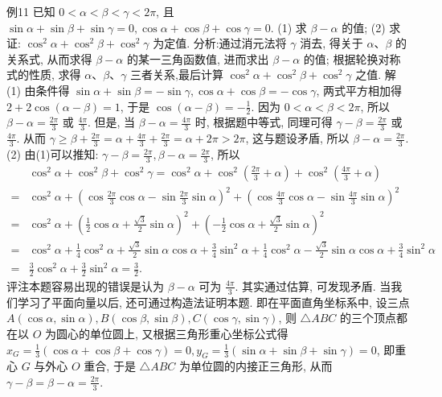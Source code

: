 例11 已知 $0<\alpha<\beta<\gamma<2 \pi$, 且 $\sin \alpha+\sin \beta+\sin \gamma=0, \cos \alpha+ \cos \beta+\cos \gamma=0$. (1) 求 $\beta-\alpha$ 的值; (2) 求证: $\cos ^2 \alpha+\cos ^2 \beta+\cos ^2 \gamma$ 为定值.
分析:通过消元法将 $\gamma$ 消去, 得关于 $\alpha 、 \beta$ 的关系式, 从而求得 $\beta-\alpha$ 的某一三角函数值, 进而求出 $\beta-\alpha$ 的值; 根据轮换对称式的性质, 求得 $\alpha 、 \beta 、 \gamma$ 三者关系,最后计算 $\cos ^2 \alpha+\cos ^2 \beta+\cos ^2 \gamma$ 之值.
解 (1) 由条件得 $\sin \alpha+\sin \beta=-\sin \gamma, \cos \alpha+\cos \beta=-\cos \gamma$, 两式平方相加得 $2+2 \cos (\alpha-\beta)=1$, 于是 $\cos (\alpha-\beta)=-\frac{1}{2}$. 因为 $0<\alpha<\beta<2 \pi$, 所以 $\beta-\alpha=\frac{2 \pi}{3}$ 或 $\frac{4 \pi}{3}$.
但是, 当 $\beta-\alpha=\frac{4 \pi}{3}$ 时, 根据题中等式, 同理可得 $\gamma-\beta=\frac{2 \pi}{3}$ 或 $\frac{4 \pi}{3}$. 从而 $\gamma \geqslant \beta+\frac{2 \pi}{3}=\alpha+\frac{4 \pi}{3}+\frac{2 \pi}{3}=\alpha+2 \pi>2 \pi$, 这与题设矛盾, 所以 $\beta-\alpha=\frac{2 \pi}{3}$.
(2) 由(1)可以推知: $\gamma-\beta=\frac{2 \pi}{3}, \beta-\alpha=\frac{2 \pi}{3}$, 所以
$$
\begin{aligned}
& \cos ^2 \alpha+\cos ^2 \beta+\cos ^2 \gamma=\cos ^2 \alpha+\cos ^2\left(\frac{2 \pi}{3}+\alpha\right)+\cos ^2\left(\frac{4 \pi}{3}+\alpha\right) \\
= & \cos ^2 \alpha+\left(\cos \frac{2 \pi}{3} \cos \alpha-\sin \frac{2 \pi}{3} \sin \alpha\right)^2+\left(\cos \frac{4 \pi}{3} \cos \alpha-\sin \frac{4 \pi}{3} \sin \alpha\right)^2 \\
= & \cos ^2 \alpha+\left(\frac{1}{2} \cos \alpha+\frac{\sqrt{3}}{2} \sin \alpha\right)^2+\left(-\frac{1}{2} \cos \alpha+\frac{\sqrt{3}}{2} \sin \alpha\right)^2 \\
= & \cos ^2 \alpha+\frac{1}{4} \cos ^2 \alpha+\frac{\sqrt{3}}{2} \sin \alpha \cos \alpha+\frac{3}{4} \sin ^2 \alpha +\frac{1}{4} \cos ^2 \alpha-\frac{\sqrt{3}}{2} \sin \alpha \cos \alpha+\frac{3}{4} \sin ^2 \alpha \\
= & \frac{3}{2} \cos ^2 \alpha+\frac{3}{2} \sin ^2 \alpha=\frac{3}{2} .
\end{aligned}
$$
评注本题容易出现的错误是认为 $\beta-\alpha$ 可为 $\frac{4 \pi}{3}$. 其实通过估算, 可发现矛盾.
当我们学习了平面向量以后, 还可通过构造法证明本题.
即在平面直角坐标系中, 设三点 $A(\cos \alpha, \sin \alpha), B(\cos \beta, \sin \beta), C(\cos \gamma, \sin \gamma)$, 则 $\triangle A B C$ 的三个顶点都在以 $O$ 为圆心的单位圆上, 又根据三角形重心坐标公式得 $x_G=\frac{1}{3}(\cos \alpha+\cos \beta+\cos \gamma)=0, y_G=\frac{1}{3}(\sin \alpha+\sin \beta+\sin \gamma)=0$, 即重心 $G$ 与外心 $O$ 重合, 于是 $\triangle A B C$ 为单位圆的内接正三角形, 从而 $\gamma-\beta= \beta-\alpha=\frac{2 \pi}{3}$.



